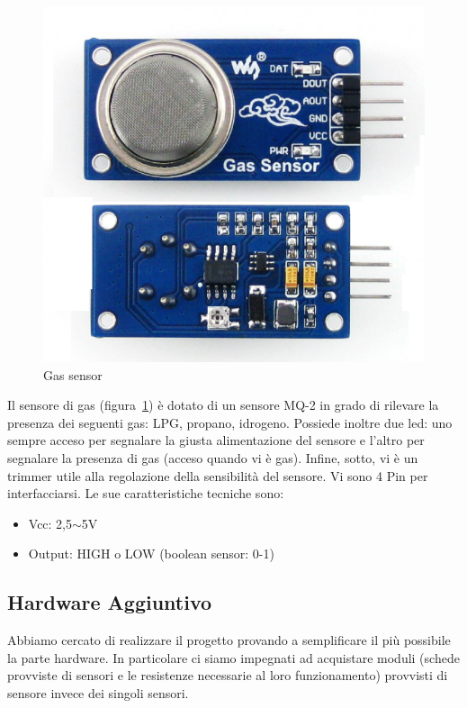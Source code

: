 \begin{figure}
	\centering
	\includegraphics[width=0.7\linewidth]{Figures/Sensors&Rasp/mq-2}
	\caption[gas]{Gas sensor}
	\label{fig:mq2}

\end{figure}

Il sensore di gas (figura~\ref{fig:mq2}) è dotato di un sensore MQ-2 in grado di rilevare la presenza dei seguenti gas:  LPG, propano, idrogeno. Possiede inoltre due led: uno sempre acceso per segnalare la giusta alimentazione del sensore e l'altro per segnalare la presenza di gas (acceso quando vi è gas). Infine, sotto, vi è un trimmer utile alla regolazione della sensibilità del sensore. Vi sono 4 Pin per interfacciarsi.
Le sue caratteristiche tecniche sono: 

\begin{itemize}
	\item Vcc: 2,5$\sim$5V
	\item Output: HIGH o LOW (boolean sensor: 0-1)
\end{itemize}

\newpage



\subsection{Hardware Aggiuntivo}

Abbiamo cercato di realizzare il progetto provando a semplificare il più possibile la parte hardware.
In particolare ci siamo impegnati ad acquistare moduli (schede provviste di sensori e le resistenze necessarie al loro funzionamento) provvisti di sensore invece dei singoli sensori.

